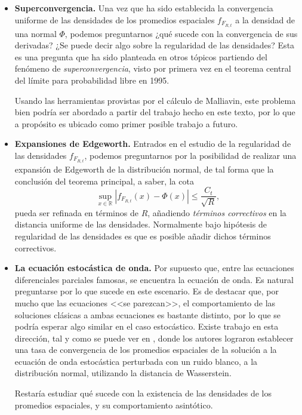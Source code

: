 \documentclass[letterpaper,twoside,12pt]{book}
\newcommand{\R}{\mathbb{R}}
\newcommand{\1}{\mathds{1}}
\newcommand{\abs}[1]{\left\lvert #1 \right\rvert}
\theoremstyle{definition}
\theoremstyle{definition}
\theoremstyle{remark}
\theoremstyle{definition}
\theoremstyle{definition}
\theoremstyle{definition}
\theoremstyle{definition}
\theoremstyle{definition}
\begin{document}
\begin{itemize}
   \item \textbf{Superconvergencia.} Una vez que ha sido establecida la convergencia uniforme de las densidades de los promedios espaciales $f_{F_{R,t}}$ a la densidad de una normal $\Phi$, podemos preguntarnos ¿qué sucede con la convergencia de sus derivadas? ¿Se puede decir algo sobre la regularidad de las densidades? Esta es una pregunta que ha sido planteada en otros tópicos partiendo del fenómeno de \textit{superconvergencia}, visto por primera vez en el teorema central del límite para probabilidad libre en 1995.
   
   Usando las herramientas provistas por el cálculo de Malliavin, este problema bien podría ser abordado a partir del trabajo hecho en este texto, por lo que a propósito es ubicado como primer posible trabajo a futuro.
   \item \textbf{Expansiones de Edgeworth.} Entrados en el estudio de la regularidad de las densidades $f_{F_{R,t}}$, podemos preguntarnos por la posibilidad de realizar una expansión de Edgeworth de la distribución normal, de tal forma que la conclusión del teorema principal, a saber, la cota 
   \[
   \sup_{x\in \R} \abs{f_{F_{R,t}}(x)-\Phi(x)}\leq \frac{C_t}{\sqrt{R}},
   \]
   pueda ser refinada en términos de $R$, añadiendo \textit{términos correctivos} en la distancia uniforme de las densidades. Normalmente bajo hipótesis de regularidad de las densidades es que es posible añadir dichos términos correctivos.

   \item \textbf{La ecuación estocástica de onda.} Por supuesto que, entre las ecuaciones diferenciales parciales famosas, se encuentra la ecuación de onda. Es natural preguntarse por lo que sucede en este escenario. Es de destacar que, por mucho que las ecuaciones <<se parezcan>>, el comportamiento de las soluciones clásicas a ambas ecuaciones es bastante distinto, por lo que se podría esperar algo similar en el caso estocástico. Existe trabajo en esta dirección, tal y como se puede ver en \cite{tudor2024spatialaveragesolutionsspdes}, donde los autores lograron establecer una tasa de convergencia de los promedios espaciales de la solución a la ecuación de onda estocástica perturbada con un ruido blanco, a la distribución normal, utilizando la distancia de Wasserstein.
   
   Restaría estudiar qué sucede con la existencia de las densidades de los promedios espaciales, y su comportamiento asintótico.


\end{itemize}
\end{document}
